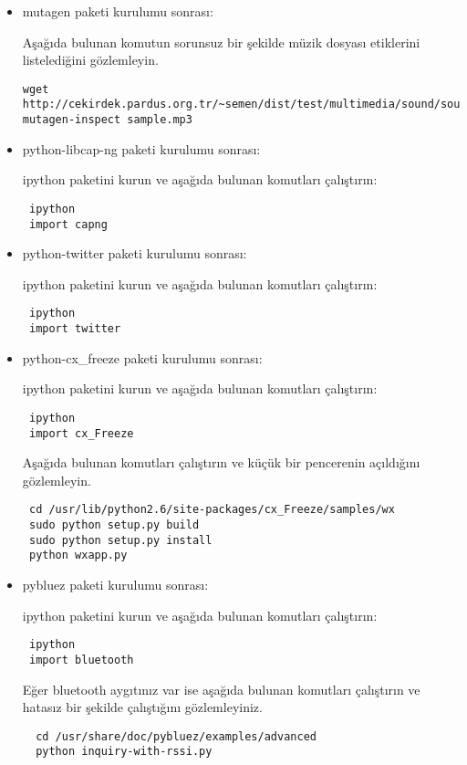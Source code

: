 \documentclass[a4paper,10pt]{article}
\begin{document}
\begin{itemize}
\item mutagen  paketi kurulumu sonrası:

Aşağıda bulunan komutun sorunsuz bir şekilde müzik dosyası etiklerini listelediğini gözlemleyin.
\begin{verbatim}
wget http://cekirdek.pardus.org.tr/~semen/dist/test/multimedia/sound/sound/sample.mp3 
mutagen-inspect sample.mp3
\end{verbatim}


\item python-libcap-ng  paketi kurulumu sonrası:

ipython paketini kurun ve aşağıda bulunan komutları çalıştırın:
\begin{verbatim}
 ipython
 import capng
\end{verbatim}

\item python-twitter paketi kurulumu sonrası:

ipython paketini kurun ve aşağıda bulunan komutları çalıştırın:
\begin{verbatim}
 ipython
 import twitter
\end{verbatim}


\item python-cx\_freeze paketi kurulumu sonrası:

ipython paketini kurun ve aşağıda bulunan komutları çalıştırın:
\begin{verbatim}
 ipython
 import cx_Freeze
\end{verbatim}

Aşağıda bulunan komutları çalıştırın ve küçük bir pencerenin açıldığını gözlemleyin.
\begin{verbatim}
 cd /usr/lib/python2.6/site-packages/cx_Freeze/samples/wx
 sudo python setup.py build
 sudo python setup.py install
 python wxapp.py
\end{verbatim}


\item pybluez paketi kurulumu sonrası:

ipython paketini kurun ve aşağıda bulunan komutları çalıştırın:
\begin{verbatim}
 ipython
 import bluetooth
\end{verbatim}

Eğer bluetooth aygıtınız var ise aşağıda bulunan komutları çalıştırın ve hatasız bir şekilde çalıştığını gözlemleyiniz.
\begin{verbatim}
  cd /usr/share/doc/pybluez/examples/advanced
  python inquiry-with-rssi.py
\end{verbatim}




\end{itemize}
\end{document}
